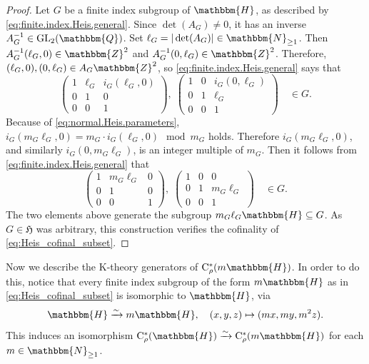 \documentclass{amsart}
\numberwithin{figure}{section}
\numberwithin{equation}{section}
\numberwithin{table}{section}
\theoremstyle{plain}
\theoremstyle{definition}
\theoremstyle{remark}
\theoremstyle{nonumber}
\newcommand{\N}{\mathbb{N}}
\newcommand{\Z}{\mathbb{Z}}
\newcommand{\Q}{\mathbb{Q}}
\newcommand{\HH}{\mathbb{H}} %
\newcommand{\Cst}{\relax\ifmmode\mathrm{C}^*\else\textup{C*}\fi}
\newcommand{\Cstr}{\Cst_\rho} %
\newcommand{\GL}{\mathrm{GL}}
\renewcommand{\mathbb}{\mathbbm} %
\begin{document}
\begin{proof}
Let $G$ be a finite index subgroup of $\HH$, as described by
\eqref{eq:finite.index.Heis.general}. Since \( \det(A_G)\neq 0 \),
it has an inverse \( A_G^{-1}\in\GL_2(\Q) \).
Set $\ell_G=|\det(A_G)|\in \N_{\geq 1}$. Then $A_G^{-1}(\ell_G,0)\in \Z^2$
and $A_G^{-1}(0,\ell_G)\in \Z^2$. Therefore, $(\ell_G,0), (0,\ell_G)\in
A_G\Z^2$, so \eqref{eq:finite.index.Heis.general} says that
\[
\begin{pmatrix} 
1 & \ell_G & i_G(\ell_G,0) \\ 0 & 1 & 0 \\ 0 & 0 & 1
\end{pmatrix},\;
\begin{pmatrix} 
1 & 0 & i_G(0,\ell_G) \\ 0 & 1 & \ell_G \\ 0 & 0 & 1 
\end{pmatrix}\quad\in G.
\]
Because of \eqref{eq:normal.Heis.parameters}, $i_G(m_G\ell_G,0)=m_G\cdot i_G(\ell_G,0)\mod m_G$ holds. Therefore $i_G(m_G\ell_G,0)$, and similarly $i_G(0,m_G\ell_G)$, is an integer multiple of $m_G$. Then it follows from \eqref{eq:finite.index.Heis.general} that
\[
\begin{pmatrix} 
1 & m_G\ell_G & 0 \\ 0 & 1 & 0 \\ 0 & 0 & 1
\end{pmatrix},\;
\begin{pmatrix} 
1 & 0 & 0 \\ 0 & 1 & m_G\ell_G \\ 0 & 0 & 1
\end{pmatrix}\quad\in G.
\]
The two elements above generate the subgroup $m_G\ell_G\HH\subseteq G$. As $G\in\mathfrak{H}$ was arbitrary, this construction verifies the cofinality of \eqref{eq:Heis_cofinal_subset}.
\end{proof}

Now we describe the K-theory generators of \( \Cstr(m\HH) \).
In order to do this, notice that every finite
index subgroup of the form \( m\HH \) as in
\eqref{eq:Heis_cofinal_subset} is isomorphic to $\HH$, via
\[
  \HH\xrightarrow{\sim}m\HH,\quad (x,y,z)\mapsto (mx,my,m^2z).
\]
This induces an isomorphism \( \Cstr(\HH)\xrightarrow{\sim}\Cstr(m\HH)
\) for each \( m\in\N_{\geq 1} \). 
\end{document}
